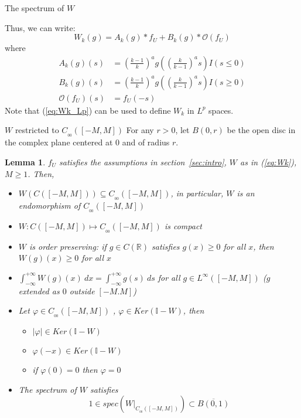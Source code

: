 \documentclass[12pt]{article}
\newtheorem*{lmm}{Lemma}
\newenvironment{definition}[1][Definition]{\begin{trivlist}
		\item[\hskip \labelsep {\bfseries #1}]}{\end{trivlist}}
\begin{document}
\begin{section}{The spectrum of $W$ }
\begin{definition}
	Thus, we can write:
	\begin{equation} \label{eq:Wk_Lp}
	W_k(g) = A_k(g)*f_U + B_k(g)*\mathcal{O}(f_U)
	\end{equation}
	where
	\begin{align*} 
	A_k(g)(s) &= \left(\frac{k-1}{k}\right)^a g(\left(\frac{k}{k-1}\right)^a s) I( s \le 0) \\
	B_k(g)(s) &= \left(\frac{k-1}{k}\right)^a g(\left(\frac{k}{k-1}\right)^a s) I( s \ge 0) \\
	\mathcal{O}(f_U)(s) &= f_U(-s)
	\end{align*}  
	Note that (\ref{eq:Wk_Lp}) can be used to define $W_k$ in $L^p$ spaces.
	
  
\end{definition}

\begin{subsection}{$W$ restricted to $C_{_{0\!0}}([-M,M])$}
	For any $r > 0$, let $B(0,r)$ be the open disc in the complex plane centered at $0$ and of radius $r$.  
	
	\begin{lmm}   $f_U$ satisfies the assumptions in section~\ref{sec:intro}, $W$ as in (\ref{eq:Wk}), $M \ge 1$. Then,
		\begin{itemize}
			\item[i.] $W(C([-M,M])) \subseteq C_{_{0\!0}}([-M,M])$, in particular, $W$ is an endomorphism of $C_{_{0\!0}}([-M,M])$
			\item[ii.] $W: C([-M,M]) \longmapsto C_{_{0\!0}}([-M,M])$ is compact 
			\item[iii.] $W$ is order preserving: if $g \in C(\mathbb{R})$ satisfies $g(x) \ge 0$ for all $x$, then $W(g)(x) \ge 0$ for all $x$ 
			\item[iv.] $\int_{-\infty}^{+\infty} W(g)(x)\ dx = \int_{-\infty}^{+\infty} g(s) \ ds $ for all $g \in L^{\infty}([-M,M])$ ($g$ extended as $0$ outside $[-M.M]$)
			\item[v.] Let $\varphi \in C_{_{0\!0}}([-M,M])$ , $\varphi \in Ker(\mathbb{I} - W)$, then
			    \begin{itemize}
				\item[a.] $|\varphi| \in  Ker(\mathbb{I} - W)$
				\item[b.] $\varphi(-x) \in Ker(\mathbb{I} - W)$
				\item[c.] if $\varphi(0) = 0$ then $\varphi = 0$
				\end{itemize} 
			\item[vi.] The spectrum of $W$ satisfies
			$$
			1 \in spec\left(W\Big|_{C_{_{0\!0}}([-M,M])}   \right) \subset \overline{B(0,1)}
			$$
			

\end{itemize}
\end{lmm}
\end{subsection}
\end{section}
\end{document}

